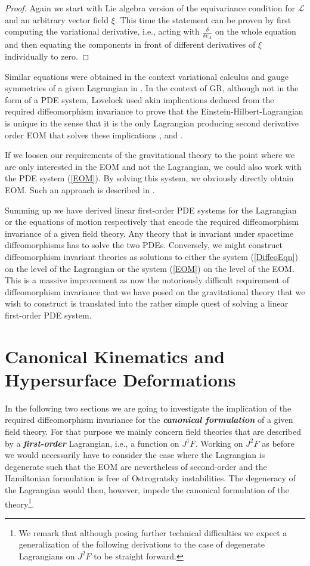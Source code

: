 \documentclass[a4paper,12pt, DIV=14, BCOR=5mm, twoside, headsepline, numbers=noenddot]{scrbook}
\begin{document}
\begin{proof}
Again we start with Lie algebra version of the equivariance condition for $\mathcal{L}$ and an arbitrary vector field $\xi$. This time the statement can be proven by first computing the variational derivative, i.e., acting with $\frac{\delta}{\delta v_A}$ on the whole equation and then equating the components in front of different derivatives of $\xi$ individually to zero. 
\end{proof}
Similar equations were obtained in the context variational calculus and gauge symmetries of a given Lagrangian in \cite{article}. In the context of GR, although not in the form of a PDE system, Lovelock used akin implications deduced from the required diffeomorphism invariance to prove that the Einstein-Hilbert-Lagrangian is unique in the sense that it is the only Lagrangian producing second derivative order EOM that solves these implications \cite{Lovelock1969}, \cite{doi:10.1063/1.1666069} and \cite{doi:10.1063/1.1665613}. 

If we loosen our requirements of the gravitational theory to the point where we are only interested in the EOM and not the Lagrangian, we could also work with the PDE system (\ref{EOM}). By solving this system, we obviously directly obtain EOM. Such an approach is described in \cite{TobiR}.

Summing up we have derived linear first-order PDE systems for the Lagrangian or the equations of motion respectively that encode the required diffeomorphism invariance of a given field theory. Any theory that is invariant under spacetime diffeomorphisms has to solve the two PDEs. Conversely, we might construct diffeomorphism invariant theories as solutions to either the system (\ref{DiffeoEqn}) on the level of the Lagrangian or the system (\ref{EOM}) on the level of the EOM. This is a massive improvement as now the notoriously difficult requirement of diffeomorphism invariance that we have posed on the gravitational theory that we wish to construct is translated into the rather simple quest of solving a linear first-order PDE system.  



\section{Canonical Kinematics and Hypersurface Deformations}
In the following two sections we are going to investigate the implication of the required diffeomorphism invariance for the \textit{\textbf{canonical formulation}} of a given field theory. For that purpose we mainly concern field theories that are described by a \textit{\textbf{first-order}} Lagrangian, i.e., a function on $J^1F$. Working on $J^2F$ as before we would necessarily have to consider the case where the Lagrangian is degenerate such that the EOM are nevertheless of second-order and the Hamiltonian formulation is free of Ostrogratsky instabilities. The degeneracy of the Lagrangian would then, however, impede the canonical formulation of the theory\footnote{We remark that although posing further technical difficulties we expect a generalization of the following derivations to the case of degenerate Lagrangians on $J^2F$ to be straight forward.}.
\end{document}
